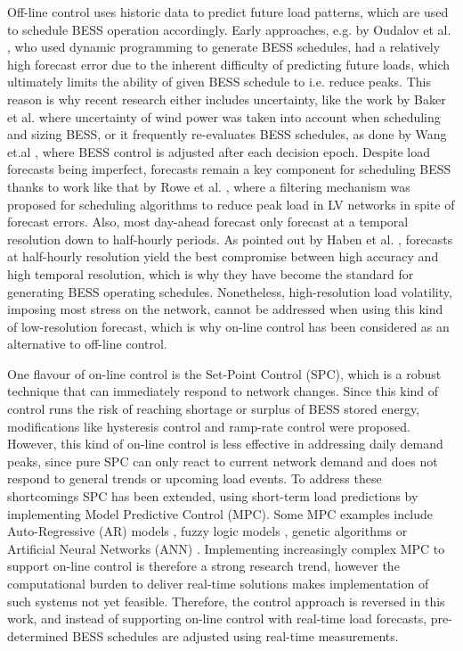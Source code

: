 Off-line control uses historic data to predict future load patterns, which are used to schedule BESS operation accordingly.
Early approaches, e.g. by Oudalov et al. \cite{Oudalov2007}, who used dynamic programming to generate BESS schedules, had a relatively high forecast error due to the inherent difficulty of predicting future loads, which ultimately limits the ability of given BESS schedule to i.e. reduce peaks.
This reason is why recent research either includes uncertainty, like the work by Baker et al. \cite{Baker2017} where uncertainty of wind power was taken into account when scheduling and sizing BESS, or it frequently re-evaluates BESS schedules, as done by Wang et.al \cite{Wang2014a}, where BESS control is adjusted after each decision epoch.
Despite load forecasts being imperfect, forecasts remain a key component for scheduling BESS thanks to work like that by Rowe et al. \cite{Rowe2014a}, where a filtering mechanism was proposed for scheduling algorithms to reduce peak load in LV networks in spite of forecast errors.
Also, most day-ahead forecast only forecast at a temporal resolution down to half-hourly periods.
As pointed out by Haben et al. \cite{Poghosyan2014, Haben2014}, forecasts at half-hourly resolution yield the best compromise between high accuracy and high temporal resolution, which is why they have become the standard for generating BESS operating schedules.
Nonetheless, high-resolution load volatility, imposing most stress on the network, cannot be addressed when using this kind of low-resolution forecast, which is why on-line control has been considered as an alternative to off-line control.

One flavour of on-line control is the Set-Point Control (SPC), which is a robust technique that can immediately respond to network changes.
Since this kind of control runs the risk of reaching shortage or surplus of BESS stored energy, modifications like hysteresis control \cite{Gybel2012} and ramp-rate control \cite{Such2012} were proposed.
However, this kind of on-line control is less effective in addressing daily demand peaks, since pure SPC can only react to current network demand and does not respond to general trends or upcoming load events.
To address these shortcomings SPC has been extended, using short-term load predictions by implementing Model Predictive Control (MPC).
Some MPC examples include Auto-Regressive (AR) models \cite{Li2009, Nie2011}, fuzzy logic models \cite{Sannomiya2001, Chen2013a}, genetic algorithms \cite{Xia2015a, Liu2015} or Artificial Neural Networks (ANN) \cite{Kalogirou2014, Quan2014, Lee2014, Pezeshki2014, Vaz2016, Reihani2016, Xiao2017}.
Implementing increasingly complex MPC to support on-line control is therefore a strong research trend, however the computational burden to deliver real-time solutions makes implementation of such systems not yet feasible.
Therefore, the control approach is reversed in this work, and instead of supporting on-line control with real-time load forecasts, pre-determined BESS schedules are adjusted using real-time measurements.

